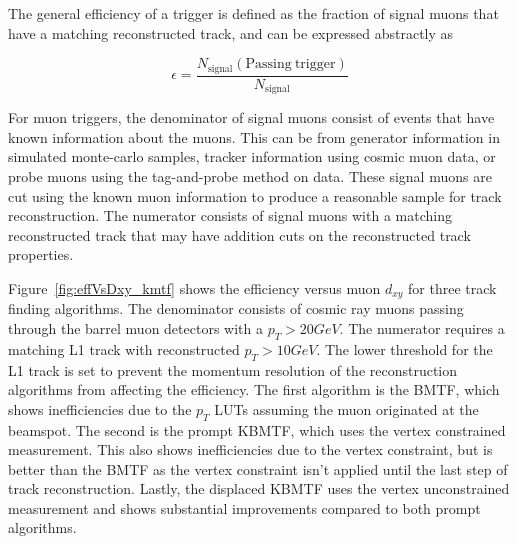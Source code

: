The general efficiency of a trigger is defined as the fraction of signal muons that have a matching reconstructed track, and can be expressed abstractly as

\begin{equation}\label{eq:eff}
	\epsilon=\frac{N_\mathrm{signal}(\mathrm{Passing\ trigger})}{N_\mathrm{signal}}	
\end{equation}

For muon triggers, the denominator of signal muons consist of events that have known information about the muons. This can be from generator information in simulated monte-carlo samples, tracker information using cosmic muon data, or probe muons using the tag-and-probe method on data. These signal muons are cut using the known muon information to produce a reasonable sample for track reconstruction. The numerator consists of signal muons with a matching reconstructed track that may have addition cuts on the reconstructed track properties.

Figure~\ref{fig:effVsDxy_kmtf} shows the efficiency versus muon $d_{xy}$ for three track finding algorithms. The denominator consists of cosmic ray muons passing through the barrel muon detectors with a $p_T>20\unit{GeV}$. The numerator requires a matching L1 track with reconstructed $p_T>10\unit{GeV}$. The lower threshold for the L1 track is set to prevent the momentum resolution of the reconstruction algorithms from affecting the efficiency. The first algorithm is the BMTF, which shows inefficiencies due to the $p_T$ LUTs assuming the muon originated at the beamspot. The second is the prompt KBMTF, which uses the vertex constrained measurement. This also shows inefficiencies due to the vertex constraint, but is better than the BMTF as the vertex constraint isn't applied until the last step of track reconstruction. Lastly, the displaced KBMTF uses the vertex unconstrained measurement and shows substantial improvements compared to both prompt algorithms.

